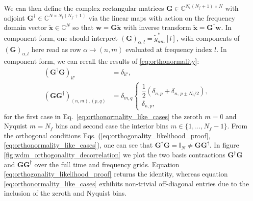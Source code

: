 \documentclass[twocolumn,preprintnumbers,
  superscriptaddress,
  nofootinbib,
  amsmath,
  amssymb,
  aps,
  prd,
  colorlinks=true,
  linkcolor=blue,
  urlcolor=blue,
  citecolor=blue,
  anchorcolor=blue
]{revtex4-2}
\begin{document}
We can then define the complex rectangular matrices $\boldsymbol{G}\in \mathbb{C}^{N_t(N_f +1) \times N}$ with adjoint $\boldsymbol{G}^{\dagger} \in \mathbb{C}^{N \times N_t(N_f + 1)}$
via the linear maps with action on the frequency domain vector $\tilde{\boldsymbol{x}}\in\mathbb{C}^{N}$ so that $\boldsymbol{w} = \boldsymbol{G}\tilde{\boldsymbol{x}}$ with inverse transform $\tilde{\boldsymbol{x}} = \boldsymbol{G}^{\dagger}\boldsymbol{w}$. In component form, one should interpret $(\boldsymbol{G})_{\alpha,l} = \tilde{g}^{*}_{nm}[l]$, with components of $(\boldsymbol{G})_{\alpha,l}$ here read as row $\alpha \mapsto (n,m)$ evaluated at frequency index $l$. In component form, we can recall the results of \eqref{eq:orthonormality}:
\begin{align}
    \left(\mathbf{G}^\dagger \mathbf{G}\right)_{ll'} 
    &= \delta_{ll'}, \label{eq:orthogonality_likelihood_proof}\\[6pt]
    \left(\mathbf{G}\mathbf{G}^\dagger\right)_{(n,m),(p,q)}
    &= \delta_{m,q}
    \begin{cases}
        \dfrac{1}{2}\left(\delta_{n,p} + \delta_{n,\,p\pm N_t/2}\right), \\[6pt]
        \delta_{n,p}, 
    \end{cases} \label{eq:orthonormality_like_cases}
\end{align}
%
for the first case in Eq.~\eqref{eq:orthonormality_like_cases} the zeroth $m = 0$ and Nyquist $m = N_f$ bins and second case the interior bins $m \in \{1,\ldots, N_f - 1\}$.
From the orthogonal conditions Eqs. (\ref{eq:orthogonality_likelihood_proof}, \ref{eq:orthonormality_like_cases}), one can see that $\boldsymbol{G}^{\dagger}\boldsymbol{G} = \mathbb{I}_{N} \neq \boldsymbol{G}\boldsymbol{G}^{\dagger}$. In figure \ref{fig:wdm_orthogonality_decorrelation} we plot the two basis contractions $\boldsymbol{G}^{\dagger}\boldsymbol{G}$ and $\boldsymbol{G}\boldsymbol{G}^{\dagger}$ over the full time and frequency grids. Equation \eqref{eq:orthogonality_likelihood_proof} returns the identity, whereas equation \eqref{eq:orthonormality_like_cases} exhibits non-trivial off-diagonal entries due to the inclusion of the zeroth and Nyquist bins.  
\end{document}
